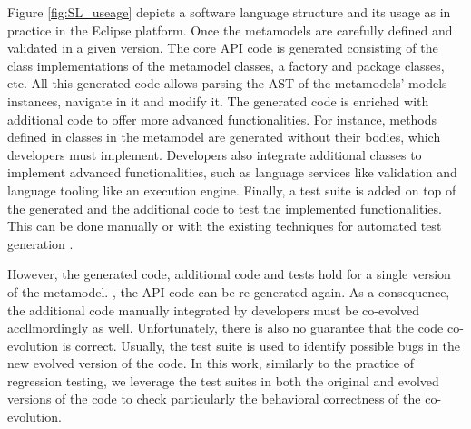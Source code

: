 Figure \ref{fig:SL_useage} depicts a software language structure and its usage as in practice in the Eclipse platform.  
%
Once the metamodels are carefully defined and validated in a given version. The core API code is generated \cite{steinberg2008emf} consisting of the class implementations of the metamodel classes, a factory and package classes, etc. All this generated code allows parsing the AST of the metamodels' models instances, navigate in it and modify it. 
The generated code is enriched with additional code to offer more advanced functionalities. For instance, methods defined in classes in the metamodel are generated without their bodies, which developers must implement. %
Developers also integrate additional classes to implement advanced functionalities, such as language services like validation and language tooling like an execution engine. %
%
Finally, a test suite is added on top of the generated and the additional code to test the implemented functionalities. This can be done manually or with the existing techniques for automated test generation \cite{fraser2011evosuite,mcminn2004search,beyer2022advances}. 

\red{}However, the generated code, additional code and tests hold for a single version of the metamodel. 
, the API code can be re-generated again. As a consequence, the additional code manually integrated by developers must be co-evolved accllmordingly as well. 
Unfortunately, there is also no guarantee that the code co-evolution is correct. 
Usually, the test suite is used to identify possible bugs in the new evolved version of the code. In this work, similarly to the practice of regression testing, we leverage the test suites in both the original and evolved versions of the code to check particularly the behavioral correctness of the co-evolution.

